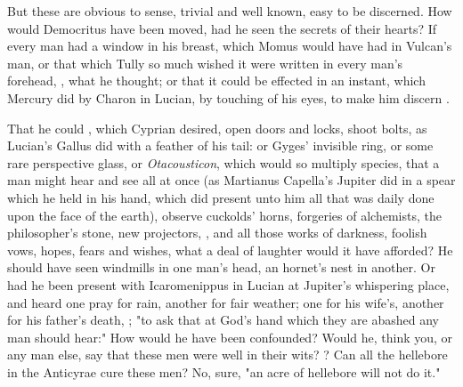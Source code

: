 But these are obvious to sense, trivial and well known, easy to be discerned.
How would Democritus have been moved, had he seen the
secrets of their hearts? If every man had a window in his breast, which Momus
would have had in Vulcan's man, or that which Tully so much wished it were
written in every man's forehead, , what
he thought; or that it could be effected in an instant, which Mercury did by
Charon in Lucian, by touching of his eyes, to make him discern .


That he could , which Cyprian desired, open doors and locks,
shoot bolts, as Lucian's Gallus did with a feather of his tail: or Gyges'
invisible ring, or some rare perspective glass, or \emph{Otacousticon}, which
would so multiply species, that a man might hear and see all at once (as
Martianus Capella's Jupiter did in a spear which he held in
his hand, which did present unto him all that was daily done upon the face of
the earth), observe cuckolds' horns, forgeries of alchemists, the philosopher's
stone, new projectors, \etc{}, and all those works of darkness, foolish vows,
hopes, fears and wishes, what a deal of laughter would it have afforded? He
should have seen windmills in one man's head, an hornet's nest in another. Or
had he been present with Icaromenippus in Lucian at Jupiter's whispering place,
and heard one pray for rain, another for fair weather; one
for his wife's, another for his father's death, \etc{}; "to ask that at God's
hand which they are abashed any man should hear:" How would he have been
confounded? Would he, think you, or any man else, say that these men were well
in their wits? ? Can all
the hellebore in the Anticyrae cure these men? No, sure,
"an acre of hellebore will not do it."

